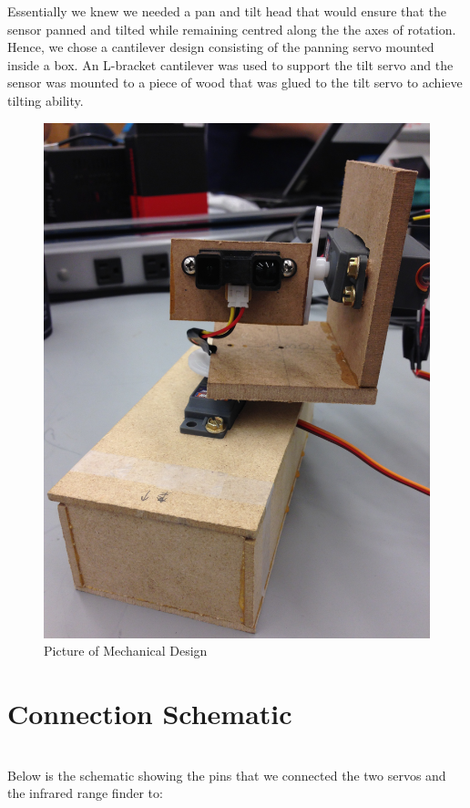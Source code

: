 \documentclass{article}
\begin{document}
Essentially we knew we needed a pan and tilt head that would ensure that the sensor panned and tilted while remaining centred along the the axes of rotation. Hence, we chose a cantilever design consisting of the panning servo mounted inside a box. An L-bracket cantilever was used to support the tilt servo and the sensor was mounted to a piece of wood that was glued to the tilt servo to achieve tilting ability. \\
%
\begin{figure}[h!]
\begin{center}
\includegraphics[scale=0.08, angle=270]{mechanism.JPG}
\caption{Picture of Mechanical Design}
\end{center}
\end{figure}
%

\section{Connection Schematic} \ \\
Below is the schematic showing the pins that we connected the two servos and the infrared range finder to:
\end{document}
